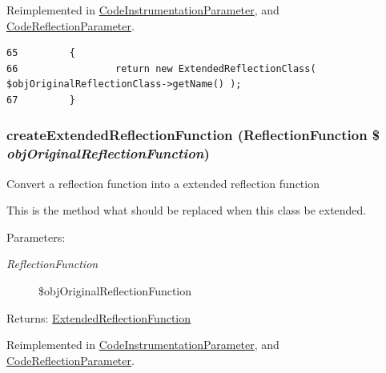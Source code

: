 Reimplemented in \hyperlink{class_code_instrumentation_parameter_6b56ec198bc6a5b5a72076e4e7c19e29}{CodeInstrumentationParameter}, and \hyperlink{class_code_reflection_parameter_6b56ec198bc6a5b5a72076e4e7c19e29}{CodeReflectionParameter}.

\begin{Code}\begin{verbatim}65         {
66                 return new ExtendedReflectionClass( $objOriginalReflectionClass->getName() );
67         }
\end{verbatim}
\end{Code}


\hypertarget{class_extended_reflection_parameter_b23ad87d3ac2f376c1a133ca6d27f031}{
\subsubsection[{createExtendedReflectionFunction}]{\setlength{\rightskip}{0pt plus 5cm}createExtendedReflectionFunction (ReflectionFunction \$ {\em objOriginalReflectionFunction})}}
\label{class_extended_reflection_parameter_b23ad87d3ac2f376c1a133ca6d27f031}


Convert a reflection function into a extended reflection function

This is the method what should be replaced when this class be extended.

\begin{Desc}
\item[Parameters:]
\begin{description}
\item[{\em ReflectionFunction}]\$objOriginalReflectionFunction \end{description}
\end{Desc}
\begin{Desc}
\item[Returns:]\hyperlink{class_extended_reflection_function}{ExtendedReflectionFunction} \end{Desc}


Reimplemented in \hyperlink{class_code_instrumentation_parameter_b23ad87d3ac2f376c1a133ca6d27f031}{CodeInstrumentationParameter}, and \hyperlink{class_code_reflection_parameter_b23ad87d3ac2f376c1a133ca6d27f031}{CodeReflectionParameter}.

